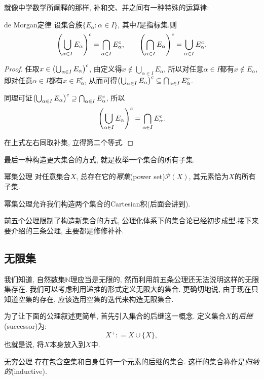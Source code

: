 就像中学数学所阐释的那样, 补和交、并之间有一种特殊的运算律: 

\begin{theorem}{de Morgan定律}
	设集合族$\{ E_{\alpha} :  \alpha \in I \}$, 其中$I$是指标集.则$$\left( \bigcup_{\alpha \in I}E_{\alpha}  \right)^c = \bigcap_{\alpha \in I} E_{\alpha}^c, \qquad \left( \bigcap_{\alpha \in I}E_{\alpha}  \right)^c = \bigcup_{\alpha \in I} E_{\alpha}^c.$$
\end{theorem}
\begin{proof}
	任取$x \in \left( \bigcup_{\alpha \in I}E_{\alpha}  \right)^c$, 由定义得$x \notin \bigcup_{\alpha \in I}E_{\alpha}$, 所以对任意$\alpha \in I$都有$x \notin E_{\alpha}$, 即对任意$\alpha \in I$都有$x \in E_{\alpha}^c$, 从而可得$\left( \bigcup_{\alpha \in I}E_{\alpha}  \right)^c \subseteq \bigcap_{\alpha \in I} E_{\alpha}^c$.
	
	同理可证$\left( \bigcup_{\alpha \in I}E_{\alpha}  \right)^c \supseteq \bigcap_{\alpha \in I} E_{\alpha}^c$, 所以$$\left( \bigcup_{\alpha \in I}E_{\alpha}  \right)^c = \bigcap_{\alpha \in I} E_{\alpha}^c.$$
	
	在上式左右同取补集, 立得第二个等式.
\end{proof}

最后一种构造更大集合的方式, 就是枚举一个集合的所有子集.

\begin{axiom}{幂集公理}
	对任意集合$X$, 总存在它的\textit{幂集}(power set)$\mathcal{P}(X)$, 其元素恰为$X$的所有子集.
\end{axiom}

幂集公理允许我们构造两个集合的Cartesian积(后面会讲到). 

前五个公理限制了构造新集合的方式, 公理化体系下的集合论已经初步成型.接下来要介绍的三条公理, 主要都是修修补补. 

\subsection{无限集}

我们知道, 自然数集$\mathbb{N}$理应当是无限的, 然而利用前五条公理还无法说明这样的无限集存在. 我们可以考虑利用递推的形式定义无限大的集合. 更确切地说, 由于现在只知道空集的存在, 应该选用空集的迭代来构造无限集合. 

为了让下面的公理叙述更简单, 首先引入集合的后继这一概念. 定义集合$X$的\textit{后继}(successor)为: $$X^{+} : = X \cup \{ X \}, $$
也就是说, 将$X$本身放入到$X$中. 

\begin{axiom}{无穷公理}
	存在包含空集和自身任何一个元素的后继的集合. 这样的集合称作是\textit{归纳的}(inductive). 
\end{axiom}

